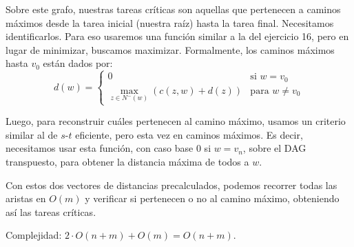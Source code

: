 \documentclass{article}
\begin{document}
Sobre este grafo, nuestras tareas críticas son aquellas que pertenecen a caminos máximos desde la tarea inicial (nuestra raíz) hasta la tarea final. Necesitamos identificarlos. Para eso usaremos una función similar a la del ejercicio 16, pero en lugar de minimizar, buscamos maximizar. Formalmente, los caminos máximos hasta $v_0$ están dados por:
\[
d(w) = \begin{cases} 
0 & \text{si } w = v_0 \\
\max_{z \in N^-(w)} (c(z,w) + d(z)) & \text{para } w \neq v_0
\end{cases}
\]

Luego, para reconstruir cuáles pertenecen al camino máximo, usamos un criterio similar al de $s$-$t$ eficiente, pero esta vez en caminos máximos. Es decir, necesitamos usar esta función, con caso base $0$ si $w = v_n$, sobre el DAG transpuesto, para obtener la distancia máxima de todos a $w$.

Con estos dos vectores de distancias precalculados, podemos recorrer todas las aristas en $O(m)$ y verificar si pertenecen o no al camino máximo, obteniendo así las tareas críticas.

Complejidad: $2 \cdot O(n+m) + O(m) = O(n + m)$.
\end{document}

